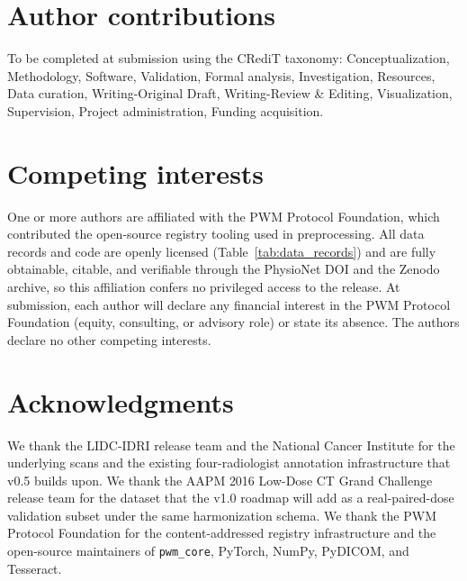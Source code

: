 \documentclass[twoside,11pt]{article}
\begin{document}
\section*{Author contributions}

To be completed at submission using the CRediT taxonomy: Conceptualization, Methodology, Software, Validation, Formal analysis, Investigation, Resources, Data curation, Writing-Original Draft, Writing-Review \& Editing, Visualization, Supervision, Project administration, Funding acquisition.

\section*{Competing interests}

One or more authors are affiliated with the PWM Protocol Foundation, which contributed the open-source registry tooling used in preprocessing. All data records and code are openly licensed (Table~\ref{tab:data_records}) and are fully obtainable, citable, and verifiable through the PhysioNet DOI and the Zenodo archive, so this affiliation confers no privileged access to the release. At submission, each author will declare any financial interest in the PWM Protocol Foundation (equity, consulting, or advisory role) or state its absence. The authors declare no other competing interests.

\section*{Acknowledgments}

We thank the LIDC-IDRI release team and the National Cancer Institute for the underlying scans and the existing four-radiologist annotation infrastructure that v0.5 builds upon. We thank the AAPM 2016 Low-Dose CT Grand Challenge release team for the dataset that the v1.0 roadmap will add as a real-paired-dose validation subset under the same harmonization schema. We thank the PWM Protocol Foundation for the content-addressed registry infrastructure and the open-source maintainers of \texttt{pwm\_core}, PyTorch, NumPy, PyDICOM, and Tesseract.



\end{document}
